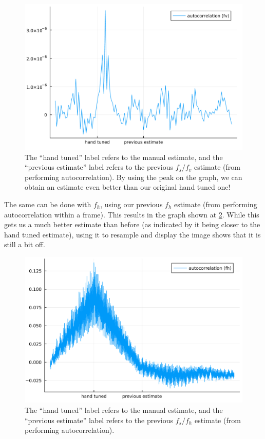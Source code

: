 \documentclass{article}
\begin{document}
\begin{figure}
    \centering
    \includegraphics[width=0.95\linewidth]{images/autocor_fv_step2.png}
    \caption{The ``hand tuned'' label refers to the manual estimate, and the ``previous estimate'' label refers to the previous $f_s/f_v$ estimate (from performing autocorrelation). By using the peak on the graph, we can obtain an estimate even better than our original hand tuned one!}
    \label{fig:xcorr-fv}
\end{figure}

The same can be done with $f_h$, using our previous $f_h$ estimate (from performing autocorrelation within a frame). This results in the graph shown at \ref{fig:xcorr-fh}. While this gets us a much better estimate than before (as indicated by it being closer to the hand tuned estimate), using it to resample and display the image shows that it is still a bit off.
\begin{figure}
    \centering
    \includegraphics[width=0.95\linewidth]{images/autocor_fh_step2.png}
    \caption{The ``hand tuned'' label refers to the manual estimate, and the ``previous estimate'' label refers to the previous $f_s/f_h$ estimate (from performing autocorrelation).}
    \label{fig:xcorr-fh}
\end{figure}
\end{document}
